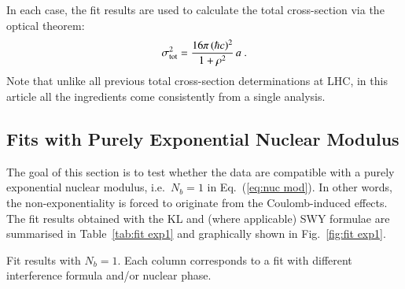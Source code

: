 In each case, the fit results are used to calculate the total cross-section via the optical theorem:
\begin{equation}
\label{eq:si tot}
\sigma_{\rm tot}^2 = {16\pi\, (\hbar c)^2\over 1 + \rho^2}\, a\ .
\end{equation}
Note that unlike all previous total cross-section determinations at LHC, in this article all the ingredients come consistently from a single analysis.


\subsection{Fits with Purely Exponential Nuclear Modulus}
\label{sec:fit exp1}

The goal of this section is to test whether the data are compatible with a purely exponential nuclear modulus, i.e.~$N_b=1$ in Eq.~(\ref{eq:nuc mod}). In other words, the non-exponentiality is forced to originate from the Coulomb-induced effects. The fit results obtained with the KL and (where applicable) SWY formulae are summarised in Table~\ref{tab:fit exp1} and graphically shown in Fig.~\ref{fig:fit exp1}.

\begin{table}
\caption{Fit results with $N_b=1$. Each column corresponds to a fit with different interference formula and/or nuclear phase.}
\vskip-3mm
\label{tab:fit exp1}
\begin{center}
\setlength\tabcolsep{2.5mm}
\small

\end{center}
\end{table}

